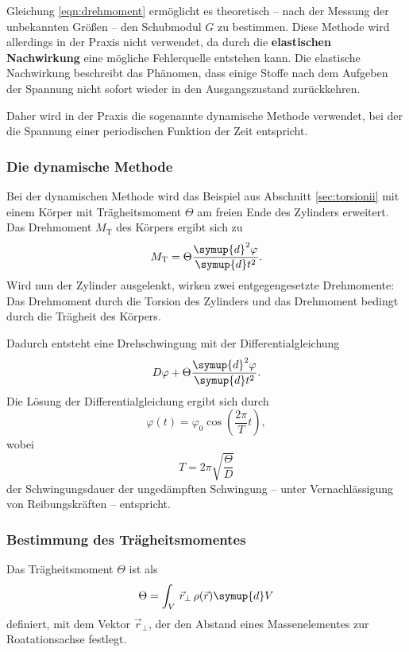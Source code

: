 Gleichung \eqref{eqn:drehmoment} ermöglicht es theoretisch -- nach der Messung der unbekannten
Größen -- den Schubmodul $G$ zu bestimmen.
Diese Methode wird allerdings in der Praxis nicht verwendet, da durch die \textbf{elastischen
Nachwirkung} eine mögliche Fehlerquelle entstehen kann.
Die elastische Nachwirkung beschreibt das Phänomen, dass einige Stoffe nach dem Aufgeben der
Spannung nicht sofort wieder in den Ausgangszustand zurückkehren.

Daher wird in der Praxis die sogenannte dynamische Methode verwendet, bei der die Spannung
einer periodischen Funktion der Zeit entspricht.

\subsubsection{Die dynamische Methode}
\label{sec:dynamisch}
Bei der dynamischen Methode wird das Beispiel aus Abschnitt \ref{sec:torsionii} mit einem Körper
mit Trägheitsmoment $\Theta$ am freien Ende des Zylinders erweitert.
Das Drehmoment $M_{\mathrm{T}}$  des Körpers ergibt sich zu
\begin{equation}
	M_{\mathrm{T}} = \Theta \frac{\symup{d}^2 \varphi}{\symup{d} t^2} \mathrm{.}
\end{equation}
Wird nun der Zylinder ausgelenkt, wirken zwei entgegengesetzte Drehmomente: Das Drehmoment
durch die Torsion des Zylinders und das Drehmoment bedingt durch die Trägheit des Körpers.

Dadurch entsteht eine Drehschwingung mit der Differentialgleichung
\begin{equation}
	D \varphi + \Theta \frac{\symup{d}^2 \varphi}{\symup{d} t^2} \mathrm{.}
\end{equation}
Die Lösung der Differentialgleichung ergibt sich durch
\begin{equation}
	\varphi(t) = \varphi_0 \cos(\frac{2\pi}{T} t) \mathrm{,}
\end{equation}
wobei
\begin{equation}
	\label{eqn:toughtimes}
	T = 2\pi \sqrt{\frac{\Theta}{D}}
\end{equation}
der Schwingungsdauer der ungedämpften Schwingung -- unter Vernachlässigung von
Reibungskräften -- entspricht.

\subsubsection{Bestimmung des Trägheitsmomentes}

Das Trägheitsmoment $\Theta$ ist als
\begin{equation*}
	\Theta = \int_V \, \vec{r}_{\perp} \, \rho(\vec{r}) \symup{d} V
\end{equation*}
definiert, mit dem Vektor $\vec{r}_{\perp}$, der den Abstand eines Massenelementes zur
Roatationsachse festlegt.

